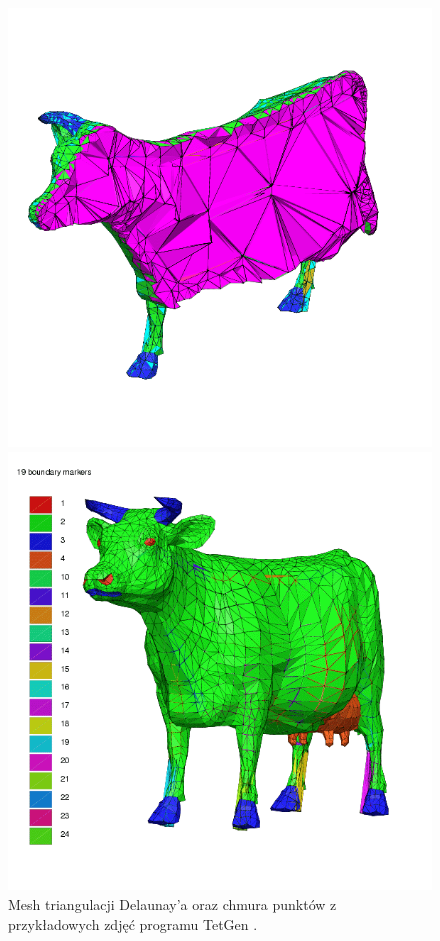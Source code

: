 \begin{figure}[H]
\centering
    \begin{minipage}[b]{0.45\linewidth}
        \includegraphics[scale=0.2]{cowDelIg.png}
    \end{minipage}
\quad
    \begin{minipage}[b]{0.45\linewidth}
        \includegraphics[scale=0.2]{cowPointsImg.png}
    \end{minipage}
\caption{Mesh triangulacji Delaunay'a oraz chmura punktów z przykładowych zdjęć programu TetGen \cite{tetGenWebsite}.}
\label{fig:tetGenPicks}
\end{figure}
